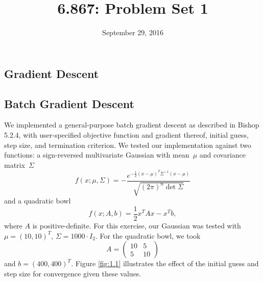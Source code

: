 \documentclass{article}
\title{6.867: Problem Set 1}
\date{September 29, 2016}
\begin{document}
\maketitle

\begin{multicols}{2}

\section{Gradient Descent}

\subsection{Batch Gradient Descent}

We implemented a general-purpose batch gradient descent as described in Bishop 5.2.4, with user-specified objective function and gradient thereof, initial guess, step size, and termination criterion. %
We tested our implementation against two functions: a sign-reversed multivariate Gaussian with mean~$\mu$ and covariance matrix~$\Sigma$
\begin{equation}
f(x; \mu, \Sigma) = -\frac{e^{-\frac12(x - \mu)^T \Sigma^{-1}(x - \mu)}}{\sqrt{(2\pi)^n \det\Sigma}}
\end{equation}
and a quadratic bowl
\begin{equation}
f(x; A, b) = \frac{1}{2}x^T Ax - x^T b,
\end{equation}
where $A$ is positive-definite. For this exercise, our Gaussian was tested with $\mu = (10, 10)^T$, $\Sigma = 1000 \cdot I_2$. For the quadratic bowl, we took \[A = \left(\begin{array}{cc}10 & 5 \\5 & 10\end{array}\right)\] and $b = (400, 400)^T$. Figure \ref{fig:1.1} illustrates the effect of the initial guess and step size for convergence given these values.


\end{multicols}
\end{document}

